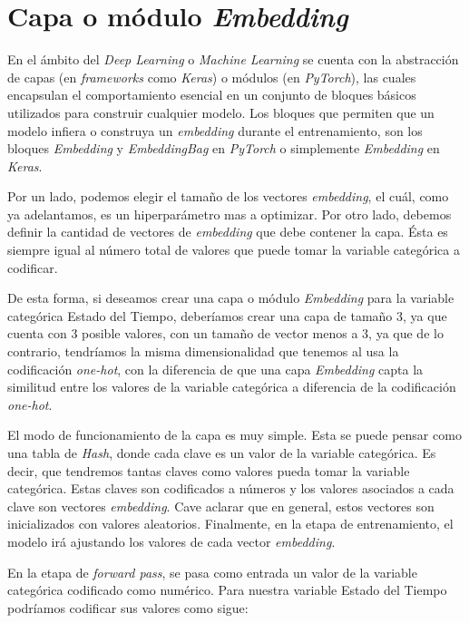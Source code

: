 \documentclass[11pt,a4paper,twoside]{thesis}
\begin{document}
\section{Capa o módulo \textit{Embedding}}

En el ámbito del \textit{Deep Learning} o \textit{Machine Learning} se cuenta
con la abstracción de capas (en \textit{frameworks} como \textit{Keras}) o
módulos (en \textit{PyTorch}), las cuales encapsulan el comportamiento esencial
en un conjunto de bloques básicos utilizados para construir cualquier modelo.
Los bloques que permiten que un modelo infiera o construya un
\textit{embedding} durante el entrenamiento, son los bloques \textit{Embedding}
y \textit{EmbeddingBag} en \textit{PyTorch} o simplemente \textit{Embedding} en
\textit{Keras}.

Por un lado, podemos elegir el tamaño de los vectores \textit{embedding}, el
cuál, como ya adelantamos, es un hiperparámetro mas a optimizar. Por otro
lado, debemos definir la cantidad de vectores de \textit{embedding} que debe
contener la capa. Ésta es siempre igual al número total de valores que puede
tomar la variable categórica a codificar.

De esta forma, si deseamos crear una capa o módulo \textit{Embedding} para la
variable categórica Estado del Tiempo, deberíamos crear una capa de tamaño 3,
ya que cuenta con 3 posible valores, con un tamaño de vector menos a 3, ya que
de lo contrario, tendríamos la misma dimensionalidad que tenemos al usa la
codificación \textit{one-hot}, con la diferencia de que una capa
\textit{Embedding} capta la similitud entre los valores de la variable
categórica a diferencia de la codificación \textit{one-hot}.

El modo de funcionamiento de la capa es muy simple. Esta se puede pensar como
una tabla de \textit{Hash}, donde cada clave es un valor de la variable
categórica. Es decir, que tendremos tantas claves como valores pueda tomar la
variable categórica. Estas claves son codificados a números y los valores
asociados a cada clave son vectores \textit{embedding}. Cave aclarar que en
general, estos vectores son inicializados con valores aleatorios. Finalmente,
en la etapa de entrenamiento, el modelo irá ajustando los valores de cada
vector \textit{embedding}.

\clearpage

En la etapa de \textit{forward pass}, se pasa como entrada un valor de la
variable categórica codificado como numérico. Para nuestra variable Estado del
Tiempo podríamos codificar sus valores como sigue:
\end{document}
